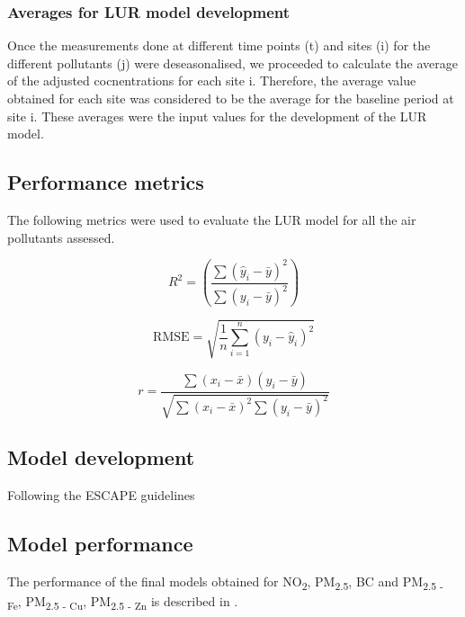 \documentclass{article}
\begin{document}
\subsubsection{Averages for LUR model development}
Once the measurements done at different time points (t) and sites (i) for the different pollutants (j) were deseasonalised, we proceeded to calculate the average of the adjusted cocnentrations for each site i. Therefore, the average value obtained for each site was considered to be the average for the baseline period at site i. These averages were the input values for the development of the LUR model. 

\newpage
\subsection{Performance metrics}
The following metrics were used to evaluate the LUR model for all the air pollutants assessed. 

\begin{equation}
R^2 = \left( \frac{\sum (\hat{y}_i - \bar{y})^2}{\sum (y_i - \bar{y})^2} \right)
\end{equation}

\begin{equation}
\text{RMSE} = \sqrt{\frac{1}{n} \sum_{i=1}^{n} (y_i - \hat{y}_i)^2}
\end{equation}

\begin{equation}
r = \frac{\sum (x_i - \bar{x})(y_i - \bar{y})}{\sqrt{\sum (x_i - \bar{x})^2 \sum (y_i - \bar{y})^2}}
\end{equation}
\vspace{0.5 cm}

\subsection{Model development}
Following the ESCAPE guidelines 


\subsection{Model performance}
The performance of the final models obtained for NO\textsubscript{2}, PM\textsubscript{2.5}, BC and PM\textsubscript{2.5 - Fe}, PM\textsubscript{2.5 - Cu}, PM\textsubscript{2.5 - Zn} is described in \textbf{}.  
\end{document}
